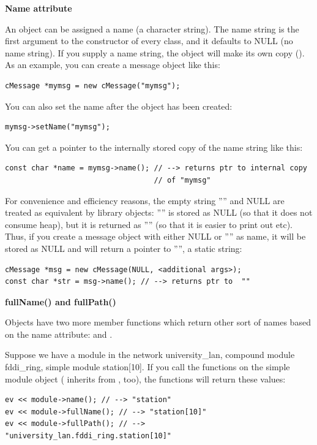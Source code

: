 \textbf{Name attribute}


An object can be assigned a name (a character string). The name
string is the first argument to the constructor of every class,
and it defaults to NULL (no name string). If you supply a name
string, the object will make its own copy (). As an example,
you can create a message object like this:

\begin{verbatim}
cMessage *mymsg = new cMessage("mymsg");
\end{verbatim}


You can also set the name after the object has been created:

\begin{verbatim}
mymsg->setName("mymsg");
\end{verbatim}

You can get a pointer to the internally stored copy of the name
string like this:

\begin{verbatim}
const char *name = mymsg->name(); // --> returns ptr to internal copy
                                  // of "mymsg"
\end{verbatim}


For convenience and efficiency reasons, the empty string ''''
and NULL are treated as equivalent by library objects: ''''
is stored as NULL (so that it does not consume heap), but it
is returned as '''' (so that it is easier to print
out etc). Thus, if you create a message object with either NULL
or '''' as name, it will be stored as NULL and 
will return a pointer to '''', a static string:

\begin{verbatim}
cMessage *msg = new cMessage(NULL, <additional args>);
const char *str = msg->name(); // --> returns ptr to  ""
\end{verbatim}


\textbf{fullName() and fullPath()}


Objects have two more member functions which return other sort
of names based on the name attribute:  and .

Suppose we have a module in the network university\_lan, compound
module fddi\_ring, simple module station[10]. If you call the functions
on the simple module object ( inherits from
, too), the functions will return these values:

\begin{verbatim}
ev << module->name(); // --> "station"
ev << module->fullName(); // --> "station[10]"
ev << module->fullPath(); // --> "university_lan.fddi_ring.station[10]"
\end{verbatim}



